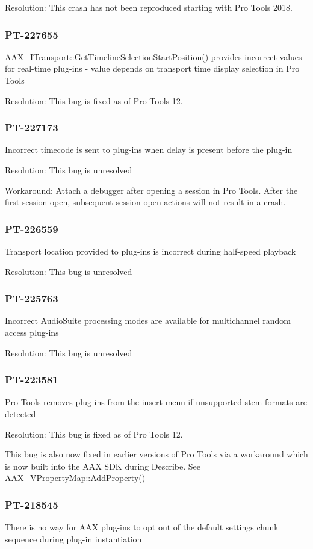 Resolution\+: This crash has not been reproduced starting with Pro Tools 2018.\hypertarget{a00846_PT-227655}{}\subsubsection{P\+T-\/227655}\label{a00846_PT-227655}
\mbox{\hyperlink{a01885_a639677fc4237183baac85d00f1a5f6d5}{A\+A\+X\+\_\+\+I\+Transport\+::\+Get\+Timeline\+Selection\+Start\+Position()}} provides incorrect values for real-\/time plug-\/ins -\/ value depends on transport time display selection in Pro Tools

Resolution\+: This bug is fixed as of Pro Tools 12.\hypertarget{a00846_PT-227173}{}\subsubsection{P\+T-\/227173}\label{a00846_PT-227173}
Incorrect timecode is sent to plug-\/ins when delay is present before the plug-\/in

Resolution\+: This bug is unresolved

Workaround\+: Attach a debugger after opening a session in Pro Tools. After the first session open, subsequent session open actions will not result in a crash.\hypertarget{a00846_PT-226559}{}\subsubsection{P\+T-\/226559}\label{a00846_PT-226559}
Transport location provided to plug-\/ins is incorrect during half-\/speed playback

Resolution\+: This bug is unresolved\hypertarget{a00846_PT-225763}{}\subsubsection{P\+T-\/225763}\label{a00846_PT-225763}
Incorrect Audio\+Suite processing modes are available for multichannel random access plug-\/ins

Resolution\+: This bug is unresolved\hypertarget{a00846_PT-223581}{}\subsubsection{P\+T-\/223581}\label{a00846_PT-223581}
Pro Tools removes plug-\/ins from the insert menu if unsupported stem formats are detected

Resolution\+: This bug is fixed as of Pro Tools 12.

This bug is also now fixed in earlier versions of Pro Tools via a workaround which is now built into the A\+AX S\+DK during Describe. See \mbox{\hyperlink{a01937_a33f4492247d093f876a150468c8cdc6d}{A\+A\+X\+\_\+\+V\+Property\+Map\+::\+Add\+Property()}}\hypertarget{a00846_PT-218545}{}\subsubsection{P\+T-\/218545}\label{a00846_PT-218545}
There is no way for A\+AX plug-\/ins to opt out of the default settings chunk sequence during plug-\/in instantiation

